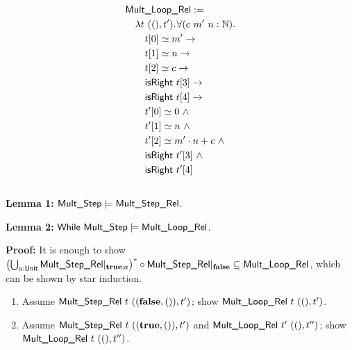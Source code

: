 \documentclass{beamer} %
\renewcommand{\eqsim}{\simeq}
\renewcommand{\VDash}{\vDash}
\renewcommand{\Nat}{\mathbb{N}}
\begin{document}
\begin{frame}
\begin{columns}
    \begin{column}{0.5\textwidth}
      \begin{align*}
        & \MS{Mult\_Loop\_Rel} := \\
        &\quad \lam{t~(\unit, t')} \forall (c~m'~n:\Nat). \\
        &\quad\quad t[0] \eqsim m' \rightarrow \\
        &\quad\quad t[1] \eqsim n \rightarrow \\
        &\quad\quad t[2] \eqsim c \rightarrow \\
        &\quad\quad \MS{isRight}~t[3] \rightarrow \\
        &\quad\quad \MS{isRight}~t[4] \rightarrow \\
        &\quad\quad t'[0] \eqsim 0 ~\land \\
        &\quad\quad t'[1] \eqsim n ~\land \\
        &\quad\quad t'[2] \eqsim m' \cdot n+c ~\land \\
        &\quad\quad \MS{isRight}~t'[3] ~\land \\
        &\quad\quad \MS{isRight}~t'[4]
      \end{align*}
    \end{column}

  \end{columns}

  \pause

  \textbf{Lemma 1:}
  $\MS{Mult\_Step} \VDash \MS{Mult\_Step\_Rel}$.

  \pause

  \textbf{Lemma 2:}
  $\MS{While}~\MS{Mult\_Step} \VDash \MS{Mult\_Loop\_Rel}$.
  

  \textbf{Proof:}
  It is enough to show $\bigl(\bigcup_{a : \textsf{Unit}} {\textsf{Mult\_Step\_Rel}{|}_{\mathbf{true}; a}}\bigr)^* \circ \textsf{Mult\_Step\_Rel}{|}_{\mathbf{false}} \subseteq \textsf{Mult\_Loop\_Rel}$,
  which can be shown by star induction.

  \tiny
  \begin{enumerate}
  \item Assume $\textsf{Mult\_Step\_Rel}~t~((\mathbf{false}, \mathbf{()}), t')$; show $\textsf{Mult\_Loop\_Rel}~t~(\mathbf{()}, t')$.
  \item Assume $\textsf{Mult\_Step\_Rel}~t~((\mathbf{true}, \mathbf{()}), t')$ and $\textsf{Mult\_Loop\_Rel}~t'~(\mathbf{()}, t'')$;
    show $\textsf{Mult\_Loop\_Rel}~t~(\mathbf{()}, t'')$.
  \end{enumerate}

\end{frame}
\end{document}
